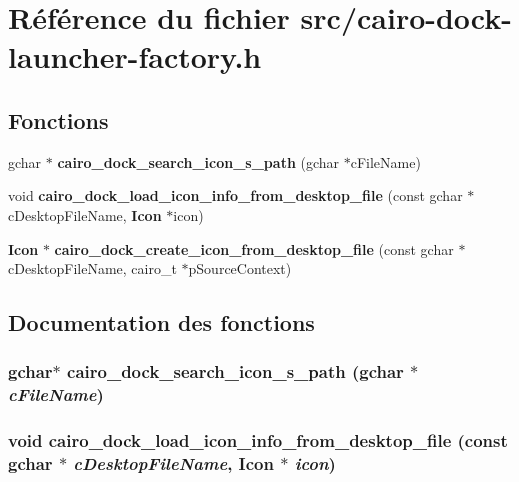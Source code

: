 \section{Référence du fichier src/cairo-dock-launcher-factory.h}
\label{cairo-dock-launcher-factory_8h}
\subsection*{Fonctions}
\begin{CompactItemize}
\item 
gchar $\ast$ {\bf cairo\_\-dock\_\-search\_\-icon\_\-s\_\-path} (gchar $\ast$cFileName)
\item 
void {\bf cairo\_\-dock\_\-load\_\-icon\_\-info\_\-from\_\-desktop\_\-file} (const gchar $\ast$cDesktopFileName, {\bf Icon} $\ast$icon)
\item 
{\bf Icon} $\ast$ {\bf cairo\_\-dock\_\-create\_\-icon\_\-from\_\-desktop\_\-file} (const gchar $\ast$cDesktopFileName, cairo\_\-t $\ast$pSourceContext)
\end{CompactItemize}


\subsection{Documentation des fonctions}
\subsubsection{\setlength{\rightskip}{0pt plus 5cm}gchar$\ast$ cairo\_\-dock\_\-search\_\-icon\_\-s\_\-path (gchar $\ast$ {\em cFileName})}\label{cairo-dock-launcher-factory_8h_78eed06457876a9d7ed2d3f106446cbd}


\subsubsection{\setlength{\rightskip}{0pt plus 5cm}void cairo\_\-dock\_\-load\_\-icon\_\-info\_\-from\_\-desktop\_\-file (const gchar $\ast$ {\em cDesktopFileName}, {\bf Icon} $\ast$ {\em icon})}\label{cairo-dock-launcher-factory_8h_153268a1483980e1451c07a78234e7e0}


